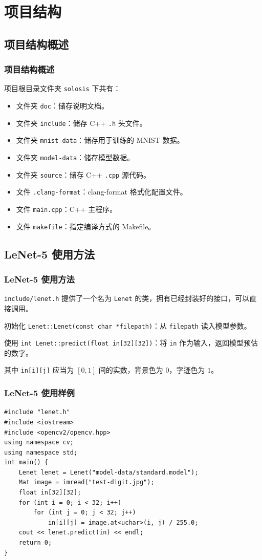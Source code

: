 \documentclass[10pt,aspectratio=43,serif]{beamer}
\begin{document}
\section{项目结构}
\subsection{项目结构概述}
\begin{frame}
    \frametitle{项目结构概述}
    项目根目录文件夹 \texttt{solosis} 下共有：

    \begin{itemize}
        \item 文件夹 \texttt{doc}：储存说明文档。
        \item 文件夹 \texttt{include}：储存 C++ \texttt{.h} 头文件。
        \item 文件夹 \texttt{mnist-data}：储存用于训练的 MNIST 数据。
        \item 文件夹 \texttt{model-data}：储存模型数据。
        \item 文件夹 \texttt{source}：储存 C++ \texttt{.cpp} 源代码。
        \item 文件 \texttt{.clang-format}：clang-format 格式化配置文件。
        \item 文件 \texttt{main.cpp}：C++ 主程序。
        \item 文件 \texttt{makefile}：指定编译方式的 Makefile。
    \end{itemize}
\end{frame}

\subsection{LeNet-5 使用方法}
\begin{frame}
    \frametitle{LeNet-5 使用方法}
    \texttt{include/lenet.h} 提供了一个名为 \lstinline|Lenet| 的类，拥有已经封装好的接口，可以直接调用。

    \begin{block}{初始化}
        \lstinline|Lenet::Lenet(const char *filepath)|：从 \lstinline|filepath| 读入模型参数。
    \end{block}

    \begin{block}{使用}
        \lstinline|int Lenet::predict(float in[32][32])|：将 \lstinline|in| 作为输入，返回模型预估的数字。
        
        其中 \lstinline|in[i][j]| 应当为 $[0, 1]$ 间的实数，背景色为 $0$，字迹色为 $1$。
    \end{block}
\end{frame}

\begin{frame}[fragile]
    \frametitle{LeNet-5 使用样例}
\begin{lstlisting}
#include "lenet.h"
#include <iostream>
#include <opencv2/opencv.hpp>
using namespace cv;
using namespace std;
int main() {
    Lenet lenet = Lenet("model-data/standard.model");
    Mat image = imread("test-digit.jpg");
    float in[32][32];
    for (int i = 0; i < 32; i++)
        for (int j = 0; j < 32; j++)
            in[i][j] = image.at<uchar>(i, j) / 255.0;
    cout << lenet.predict(in) << endl;
    return 0;
}
\end{lstlisting}
\end{frame}
\end{document}
